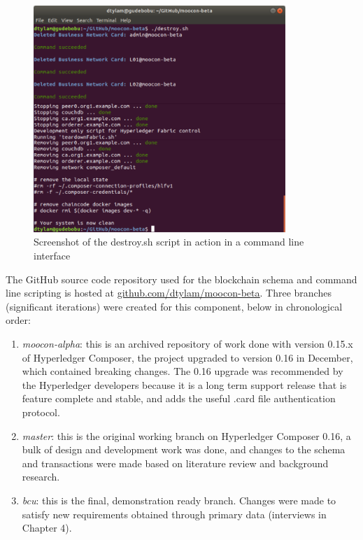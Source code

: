 \begin{enumerate}
	      \begin{figure}[!ht]
		      \centering
		      \includegraphics[width=0.85\textwidth]{destroysh}
		      \caption[Blockchain Teardown Script Screenshot]
		      {Screenshot of the destroy.sh script in action in a command line interface}
		      \label{fig:destroysh}
	      \end{figure}
\end{enumerate}

The GitHub source code repository used for the blockchain schema and command line scripting 
is hosted at \href{https://github.com/dtylam/moocon-beta}{\underline{github.com/dtylam/moocon-beta}}.
Three branches (significant iterations) were created for this component, below in chronological order:
\begin{enumerate}
	\setlength\itemsep{0em}
	\item \textit{moocon-alpha}: this is an archived repository of work done with version 0.15.x of
	      Hyperledger Composer, the project upgraded to version 0.16 in December, which contained breaking changes.
	      The 0.16 upgrade was recommended by the Hyperledger developers because it is a long term support
	      release that is feature complete and stable, and adds the useful .card file authentication protocol.
	\item \textit{master}: this is the original working branch on Hyperledger Composer 0.16, a bulk of
	      design and development work was done, and changes to the schema and transactions were made based on
	      literature review and background research.
	\item \textit{bcu}: this is the final, demonstration ready branch. Changes were made to satisfy
	      new requirements obtained through primary data (interviews in Chapter 4).
\end{enumerate}

